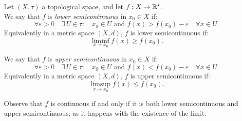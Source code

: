 \begin{defn}
	Let $(X,\tau)$ a topological space, and let $f : X \to \mathbb R^\star$.\\
	We say that $f$ is \emph{lower semicontinuous} in $x_0 \in X$ if:
	$$\forall \varepsilon > 0 \quad \exists \, U \in \tau : \quad x_0 \in U  \text{ and } f(x) > f(x_0)- \varepsilon \quad \forall x \in U.$$
	Equivalently in a metric space $(X, d)$, $f$ is lower semicontinuous if:
	$$\liminf\limits_{x \to x_0} f(x) \geq f(x_0).$$

	We say that $f$ is \emph{upper semicontinuous} in $x_0 \in X$ if:
	$$\forall \varepsilon > 0 \quad \exists \, U \in \tau : \quad x_0 \in U  \text{ and } f(x) < f(x_0)- \varepsilon \quad \forall x \in U.$$
	Equivalently in a metric space $(X, d)$, $f$ is upper semicontinuous if:
	$$\limsup\limits_{x \to x_0} f(x) \leq f(x_0).$$
\end{defn}
Observe that $f$ is continuous if and only if it is both lower semicontinuous and upper semicontinuous; as it happens with the existence of the limit.

